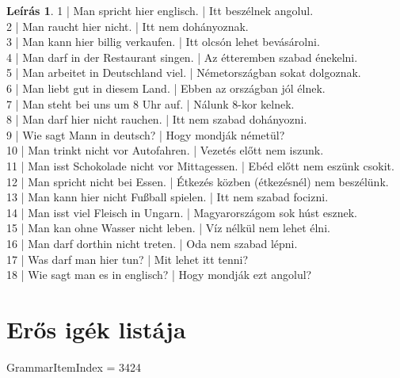 \documentclass{article}
\theoremstyle{definition}
\newtheorem*{desc}{Leírás}
\begin{document}
\begin{desc}	%
1 | Man spricht hier englisch. | Itt beszélnek angolul.\\
2 | Man raucht hier nicht. | Itt nem dohányoznak.\\
3 | Man kann hier billig verkaufen. | Itt olcsón lehet bevásárolni.\\
4 | Man darf in der Restaurant singen. | Az étteremben szabad énekelni.\\
5 | Man arbeitet in Deutschland viel. | Németországban sokat dolgoznak.\\
6 | Man liebt gut in diesem Land. | Ebben az országban jól élnek.\\
7 | Man steht bei uns um 8 Uhr auf. | Nálunk 8-kor kelnek.\\
8 | Man darf hier nicht rauchen. | Itt nem szabad dohányozni.\\
9 | Wie sagt Mann in deutsch? | Hogy mondják németül?\\
10 | Man trinkt nicht vor Autofahren. | Vezetés előtt nem iszunk.\\ 
11 | Man isst Schokolade nicht vor Mittagessen. | Ebéd előtt nem eszünk csokit.\\
12 | Man spricht nicht bei Essen. | Étkezés közben (étkezésnél) nem beszélünk.\\
13 | Man kann hier nicht Fußball spielen. | Itt nem szabad focizni.\\
14 | Man isst viel Fleisch in Ungarn. | Magyarországom sok húst esznek.\\
15 | Man kan ohne Wasser nicht leben. | Víz nélkül nem lehet élni.\\
16 | Man darf dorthin nicht treten. | Oda nem szabad lépni.\\
17 | Was darf man hier tun? | Mit lehet itt tenni?\\
18 | Wie sagt man es in englisch? | Hogy mondják ezt angolul?\\
\end{desc}

\section{Erős igék listája}

GrammarItemIndex = 3424
\end{document}
